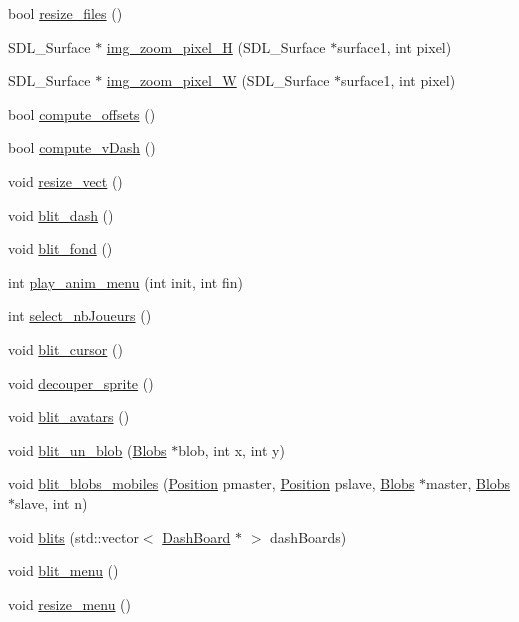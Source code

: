 \begin{DoxyCompactItemize}
bool \hyperlink{a00011_a57a833c82b51162dc1ff9682fce7ac79}{resize\_\-files} ()
\item 
SDL\_\-Surface $\ast$ \hyperlink{a00011_aa69b04a060c46db5f77e762e5e236852}{img\_\-zoom\_\-pixel\_\-H} (SDL\_\-Surface $\ast$surface1, int pixel)
\item 
SDL\_\-Surface $\ast$ \hyperlink{a00011_a308b62bf273262c54fd355fc60cc7c9c}{img\_\-zoom\_\-pixel\_\-W} (SDL\_\-Surface $\ast$surface1, int pixel)
\item 
bool \hyperlink{a00011_ad1fe91f0ea2d2bac39fc9a7127d7557f}{compute\_\-offsets} ()
\item 
bool \hyperlink{a00011_a6cdb65bbf7fb79217512000f00191e2b}{compute\_\-vDash} ()
\item 
void \hyperlink{a00011_ace09c48496eeefa8ea8fe9e187eec909}{resize\_\-vect} ()
\item 
void \hyperlink{a00011_a5181b163e848a46bfb74e58a968705d4}{blit\_\-dash} ()
\item 
void \hyperlink{a00011_a568dd368bdd332b1ac867e8915bf2ff8}{blit\_\-fond} ()
\item 
int \hyperlink{a00011_a66cc30a89b13d0895416d5bd80b40ded}{play\_\-anim\_\-menu} (int init, int fin)
\item 
int \hyperlink{a00011_a38e3ffa36df556ac7ce4d4a9d41a9b72}{select\_\-nbJoueurs} ()
\item 
void \hyperlink{a00011_acb5e4817b1b1b2c406c4b2e0c4bfa810}{blit\_\-cursor} ()
\item 
void \hyperlink{a00011_a614825ffbb2dc7c84580d4e8b2ff93e4}{decouper\_\-sprite} ()
\item 
void \hyperlink{a00011_aafbd6e6b0743e017964f53ea04de1903}{blit\_\-avatars} ()
\item 
void \hyperlink{a00011_a1c61cf8412148067616fd92b409f11eb}{blit\_\-un\_\-blob} (\hyperlink{a00002}{Blobs} $\ast$blob, int x, int y)
\item 
void \hyperlink{a00011_ae5bc9e2ed46c0448eb4f7dea08217b45}{blit\_\-blobs\_\-mobiles} (\hyperlink{a00014}{Position} pmaster, \hyperlink{a00014}{Position} pslave, \hyperlink{a00002}{Blobs} $\ast$master, \hyperlink{a00002}{Blobs} $\ast$slave, int n)
\item 
void \hyperlink{a00011_a1564b6d5334c9a23025b6090c1968bca}{blits} (std::vector$<$ \hyperlink{a00006}{DashBoard} $\ast$ $>$ dashBoards)
\item 
void \hyperlink{a00011_a673e0a32ae093bd4e4f07fa0ef2e3839}{blit\_\-menu} ()
\item 
void \hyperlink{a00011_a7b46b20070935b72451550dc23a5d37c}{resize\_\-menu} ()

\end{DoxyCompactItemize}
